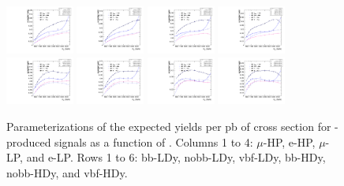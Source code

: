 \begin{figure}[htbp]
  \includegraphics[width=0.2\textwidth]{fig/analysis/paramSignalYield_VBFSig_mu_HP_nobb_DEtaHi.pdf}
  \includegraphics[width=0.2\textwidth]{fig/analysis/paramSignalYield_VBFSig_e_HP_nobb_DEtaHi.pdf}
  \includegraphics[width=0.2\textwidth]{fig/analysis/paramSignalYield_VBFSig_mu_LP_nobb_DEtaHi.pdf}
  \includegraphics[width=0.2\textwidth]{fig/analysis/paramSignalYield_VBFSig_e_LP_nobb_DEtaHi.pdf}\\
  \includegraphics[width=0.2\textwidth]{fig/analysis/paramSignalYield_VBFSig_mu_HP_vbf_DEtaHi.pdf}
  \includegraphics[width=0.2\textwidth]{fig/analysis/paramSignalYield_VBFSig_e_HP_vbf_DEtaHi.pdf}
  \includegraphics[width=0.2\textwidth]{fig/analysis/paramSignalYield_VBFSig_mu_LP_vbf_DEtaHi.pdf}
  \includegraphics[width=0.2\textwidth]{fig/analysis/paramSignalYield_VBFSig_e_LP_vbf_DEtaHi.pdf}\\
  \caption{
    Parameterizations of the expected yields per pb of cross section for \VBF-produced signals as a function of \MX.
    Columns 1 to 4: $\mu$-HP, e-HP, $\mu$-LP, and e-LP.
    Rows 1 to 6: bb-LDy, nobb-LDy, vbf-LDy, bb-HDy, nobb-HDy, and vbf-HDy.}
  \label{fig:YieldParam_VBF_Run2}
\end{figure}

